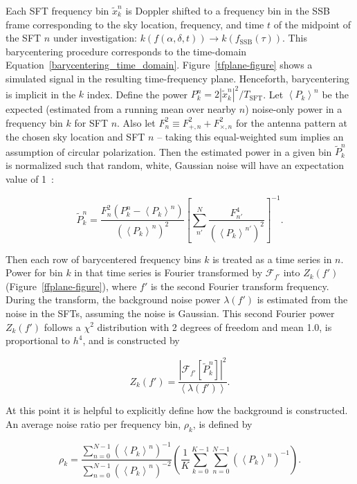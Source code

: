 \documentclass[12pt]{iopart}
\begin{document}
Each SFT frequency bin $\tilde{x}^n_k$ is Doppler shifted to a frequency bin in the SSB frame corresponding to the sky location, frequency, and time $t$ of the midpoint of the SFT $n$ under investigation: $k(f(\alpha,\delta,t)) \rightarrow k(f_\mathrm{SSB}(\tau))$.
This barycentering procedure corresponds to the time-domain Equation~\ref{barycentering_time_domain}.
Figure~\ref{tfplane-figure}
shows a simulated signal in the resulting time-frequency plane.
Henceforth, barycentering is implicit in the $k$ index.
Define the power $P^n_k = 2|\tilde{x}^n_k|^2/T_\mathrm{SFT}$.
Let $\left<P_k\right>^n$ be the expected (estimated from a running mean over nearby $n$) noise-only power in a frequency bin $k$ for SFT $n$.
Also let $F^2_n \equiv F_{+,n}^2 + F_{\times,n}^2$ for the antenna pattern at the chosen sky location and SFT $n$ -- taking this equal-weighted sum implies an assumption of circular polarization. 
Then the estimated power in a given bin $\tilde{P}^n_k$ is normalized such that random, white, Gaussian noise will have an expectation value of 1~\cite{GoetzTwoSpectMethods2011}:

\begin{equation}
\tilde{P}^n_k = \frac{F_n^2 (P_k^n - \left<P_k\right>^n)}{(\left<P_k\right>^n)^2}\left[\sum\limits_{n'}^N \frac{F_{n'}^4}{(\left<P_k\right>^{n'})^2} \right]^{-1}.
\label{equation_with_antenna_pattern}
\end{equation}

Then each row of barycentered frequency bins $k$ is treated as a time series in $n$.
Power for bin $k$ in that time series is Fourier transformed by $\mathcal{F}_{f'}$ into $Z_k(f')$ (Figure~\ref{ffplane-figure}), where $f'$ is the second Fourier transform frequency.
During the transform, the background noise power $\lambda(f')$ is estimated from the noise in the SFTs, assuming the noise is Gaussian.
This second Fourier power $Z_k(f')$ follows a $\chi^2$ distribution with 2 degrees of freedom and mean 1.0, is proportional to $h^4$, and is constructed by 

\begin{equation}
Z_k(f') = \frac{\left| \mathcal{F}_{f'} [\tilde{P}^n_k]  \right|^2}{\left< \lambda(f') \right>}.
\label{second_Fourier_power}
\end{equation}

At this point it is helpful to explicitly define how the background is constructed.
An average noise ratio per frequency bin, $\rho_k$, is defined by

\begin{equation}
\rho_k = \frac{\sum_{n=0}^{N-1} \left(\left<P_k\right>^n\right)^{-1}}{\sum_{n=0}^{N-1} \left(\left<P_k\right>^n\right)^{-2}} \left(\frac{1}{K} \sum_{k=0}^{K-1} \sum_{n=0}^{N-1} \left(\left<P_k\right>^n\right)^{-1} \right).
\end{equation}
\end{document}
